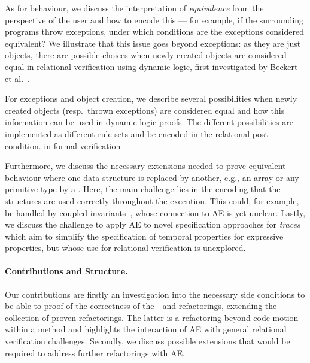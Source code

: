 As for behaviour, we discuss the interpretation of \textit{equivalence} from the perspective of the user and how to encode this --- for example, if the surrounding programs throw exceptions, under which conditions are the exceptions considered equivalent?
We illustrate that this issue goes beyond exceptions:
as they are just objects, there are possible choices when newly created objects are considered equal in relational verification using dynamic logic, 
first investigated by Beckert et al.~\cite{DBLP:conf/lopstr/BeckertBKSSU13}.



For exceptions and object creation, we describe several possibilities when newly created objects (resp.\ thrown exceptions) are considered equal
and how this information can be used in dynamic logic proofs. The different possibilities are implemented as different rule sets and  be encoded in the relational post-condition.
 in formal verification~\cite{DBLP:journals/corr/abs-1211-6186,DBLP:series/lncs/HahnleH19}.


Furthermore, we discuss the necessary extensions needed to prove equivalent behaviour where one data structure is replaced by another, e.g., an array or any primitive type by a .
Here, the main challenge lies in the encoding that the structures are used correctly throughout the execution.
This could, for example, be handled by coupled invariants~\cite{DBLP:conf/birthday/BeckertU18}, whose connection to AE is yet unclear. 
Lastly, we discuss the challenge to apply AE to novel specification approaches for \emph{traces} which aim to simplify the specification of temporal properties for expressive properties, but whose use for relational verification is unexplored.

\paragraph{Contributions and Structure.}
Our contributions are firstly an investigation into the necessary side conditions to be able to proof of the correctness of the - and  refactorings, extending the collection of proven refactorings.
The latter is a refactoring beyond code motion within a method and highlights the interaction of AE with general relational verification challenges.
Secondly, we discuss possible extensions that would be required to address further refactorings with AE.

